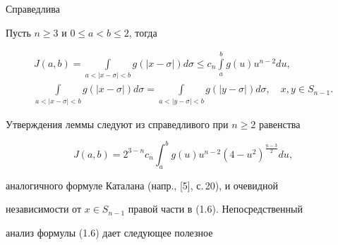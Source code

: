 Справедлива





\begin{lems}


Пусть $n \ge 3$ и $0\le a <b \le 2$, тогда


\begin{gather}


J(a,b)=\int \limits_{a <|x-\sigma|< b} g(|x-\sigma|) d\sigma \le c_n


\int \limits_a^b g(u) u^{n-2} du,\\


%


\int \limits_{a < |x-\sigma| < b} g(|x-\sigma|)d\sigma = \int \limits_{a


 < |y-\sigma| < b} g(|y-\sigma|) d\sigma, \quad x,y \in S_{n-1}.


\end{gather}


\end{lems}





Утверждения леммы следуют из справедливого при $n\ge 2$ равенства


\begin{equation}


J(a,b)= 2^{3-n}c_n


\int_a^b g(u) u^{n-2}(4-u^2)^{\frac{n-3}{2}} du,


\end{equation}


аналогичного формуле Каталана (напр., [5], с.\,20), и очевидной


независимости от $x\in S_{n-1}$ правой части в (1.6). Непосредственный


анализ формулы (1.6) дает следующее полезное





